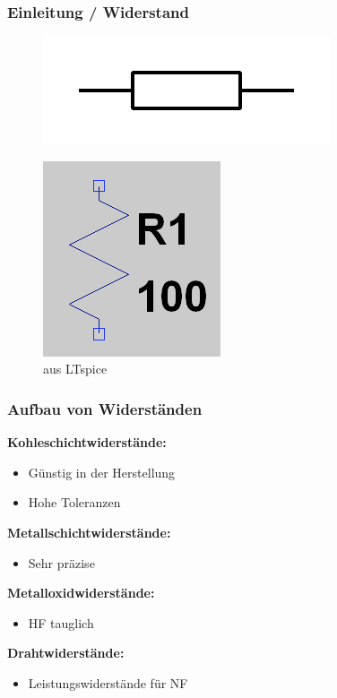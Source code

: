 \begin{frame}
  \frametitle{Einleitung / Widerstand}

  \begin{center}
    \begin{figure}
      \includegraphics[width=.4\textwidth,height=.2\textheight,keepaspectratio]{e04/Resistor_symbol_IEC.png}
    \end{figure}
  \end{center}

  \begin{center}
    \begin{figure}
      \includegraphics[width=.4\textwidth,height=.4\textheight,keepaspectratio]{e04/R_LTspice.png}
      \caption{aus LTspice}
    \end{figure}
  \end{center}
\end{frame}

\begin{frame}
  \frametitle{Aufbau von Widerständen}
  \textbf{Kohleschichtwiderstände:}
  \pause
  \begin{itemize}
    \item Günstig in der Herstellung
    \item Hohe Toleranzen
  \end{itemize}
  \pause
  \textbf{Metallschichtwiderstände:}
  \pause
  \begin{itemize}
    \item Sehr präzise
  \end{itemize}
  \pause
  \textbf{Metalloxidwiderstände:}
  \pause
  \begin{itemize}
    \item HF tauglich
  \end{itemize}
  \pause
  \textbf{Drahtwiderstände:}
  \pause
  \begin{itemize}
    \item Leistungswiderstände für NF
  \end{itemize}
\end{frame}

